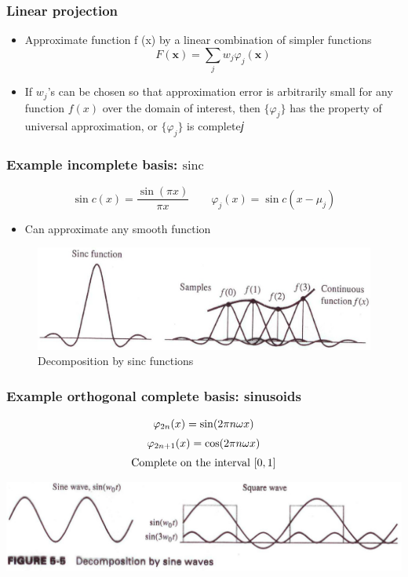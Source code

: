 \documentclass[12pt,notes,mathserif]{beamer}
\begin{document}
\begin{frame}[c]
	\frametitle{Linear projection}
	\begin{itemize}
		\item Approximate function f (x) by a linear combination of simpler functions
		      \[
			      F(\mathbf{x})=\sum_jw_j\varphi_j(\mathbf{x})
		      \]
		\item If $w_j$'s can be chosen so that approximation error is arbitrarily small for any function $f(x)$ over the domain of interest, then $\{\varphi_j\}$ has the property of universal approximation, or $\{\varphi_j\}$ is complete𝑗

	\end{itemize}
\end{frame}
\begin{frame}[c]
	\frametitle{Example incomplete basis: $\mathrm{sinc}$}
	\[
		\sin c(x)=\frac{\sin(\pi x)}{\pi x}\qquad
		\varphi_j(x)=\sin c(x-\mu_j)
	\]\vspace*{-5mm}
	\begin{itemize}
		\item Can approximate any smooth function
	\end{itemize}
	\begin{figure}
		\centering
		\includegraphics[width=0.85\linewidth]{fig/lec77.jpg}
		\caption{Decomposition by sinc functions}
	\end{figure}
\end{frame}

\begin{frame}[c]
	\frametitle{Example orthogonal complete basis: sinusoids}
	\begin{equation*}
		\begin{array}{c}
			\varphi_{2n}(x)=\sin (2\pi n\omega x)   \\[2mm]
			\varphi_{2n+1}(x)=\cos (2\pi n\omega x) \\[2mm]
			{\rm Complete~on~the~interval}~[0,1]
		\end{array}
	\end{equation*}
	\begin{center}
		\includegraphics[width=0.95\linewidth]{fig/lec78.jpg}
	\end{center}
\end{frame}
\end{document}
